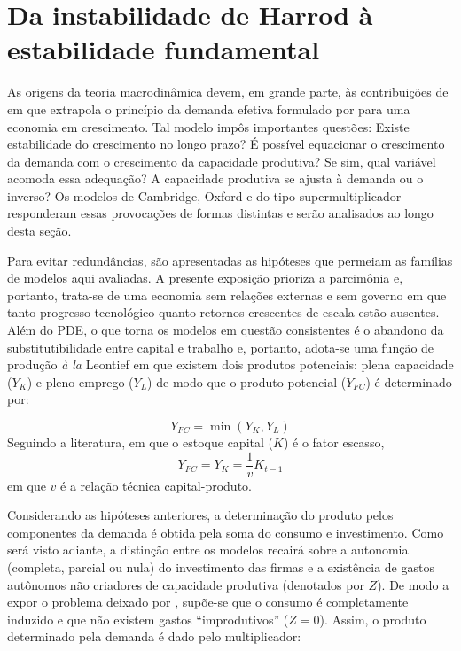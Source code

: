 
\section{Da instabilidade de Harrod à estabilidade fundamental}\label{SecHarrod}

As origens da teoria macrodinâmica devem, em grande parte, às contribuições de \textcite{harrod_essay_1939} em que extrapola o princípio da demanda efetiva formulado por \textcite{keynes_general_1936} para uma economia em crescimento. Tal modelo impôs importantes questões: Existe estabilidade do crescimento no longo pra\-zo? É possível equacionar o crescimento da demanda com o crescimento da capacidade produtiva? Se sim, qual variável acomoda essa adequação? A capacidade produtiva se ajusta à demanda ou o inverso? Os modelos de Cambridge, Oxford e do tipo supermultiplicador responderam essas provocações de formas distintas e serão analisados ao longo desta seção.

Para evitar redundâncias, são apresentadas as hipóteses que permeiam as famílias de modelos aqui avaliadas. 
A presente exposição prioriza a parcimônia e, portanto, trata-se de uma economia sem relações externas e sem governo em que tanto progresso tecnológico quanto retornos crescentes de escala estão ausentes. Além do PDE, o que torna os modelos em questão consistentes é o abandono da substitutibilidade entre capital e trabalho e, portanto, adota-se uma função de produção \textit{à la} Leontief em que existem dois produtos potenciais: plena capacidade ($Y_K$) e pleno emprego ($Y_L$) de modo que o produto potencial ($Y_{FC}$) é determinado por:

\begin{equation}
    Y_{FC} = \min (Y_K, Y_L)
\end{equation}
Seguindo a literatura, em que o estoque capital ($K$) é o fator escasso,
\begin{equation}
\label{Oferta}
    Y_{FC} = Y_K = \frac{1}{v}K_{t-1}
\end{equation}
em que $v$ é a relação técnica capital-produto. 


Considerando as hipóteses anteriores, a determinação do produto pelos componentes da demanda é obtida pela soma do consumo e investimento. Como será visto adiante, a distinção entre os modelos recairá sobre a autonomia (completa, parcial ou nula) do investimento das firmas e a existência de gastos autônomos não criadores de capacidade produtiva (denotados por $Z$). De modo a expor o problema deixado por \textcite{harrod_essay_1939}, supõe-se que o consumo é completamente induzido e que não existem gastos ``improdutivos'' ($Z=0$). Assim, o produto determinado pela demanda é dado pelo multiplicador:

